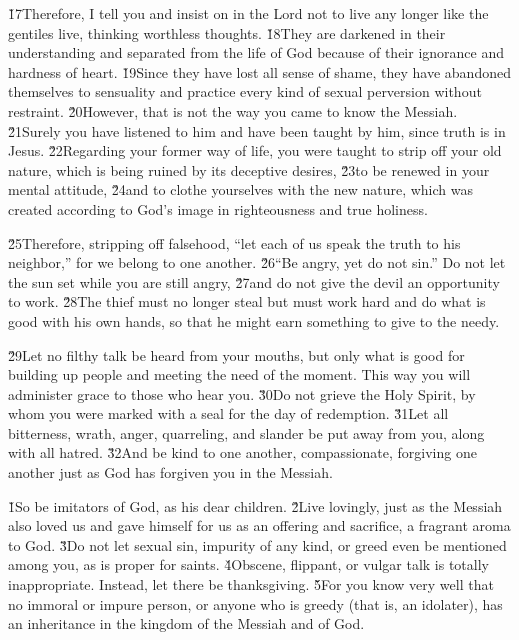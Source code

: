 \v{17}Therefore, I tell you and insist on in the Lord not to live any longer like the gentiles live, thinking worthless thoughts. \v{18}They are darkened in their understanding and separated from the life of God because of their ignorance and hardness of heart. \v{19}Since they have lost all sense of shame, they have abandoned themselves to sensuality and practice every kind of sexual perversion without restraint. \v{20}However, that is not the way you came to know the Messiah. \v{21}Surely you have listened to him and have been taught by him, since truth is in Jesus. \v{22}Regarding your former way of life, you were taught to strip off your old nature, which is being ruined by its deceptive desires, \v{23}to be renewed in your mental attitude, \v{24}and to clothe yourselves with the new nature, which was created according to God's image in righteousness and true holiness.

\v{25}Therefore, stripping off falsehood, ``let each of us speak the truth to his neighbor,'' for we belong to one another. \v{26}``Be angry, yet do not sin.'' Do not let the sun set while you are still angry, \v{27}and do not give the devil an opportunity to work. \v{28}The thief must no longer steal but must work hard and do what is good with his own hands, so that he might earn something to give to the needy.

\v{29}Let no filthy talk be heard from your mouths, but only what is good for building up people and meeting the need of the moment. This way you will administer grace to those who hear you. \v{30}Do not grieve the Holy Spirit, by whom you were marked with a seal for the day of redemption. \v{31}Let all bitterness, wrath, anger, quarreling, and slander be put away from you, along with all hatred. \v{32}And be kind to one another, compassionate, forgiving one another just as God has forgiven you in the Messiah.

\v{1}So be imitators of God, as his dear children. \v{2}Live lovingly, just as the Messiah also loved us and gave himself for us as an offering and sacrifice, a fragrant aroma to God. \v{3}Do not let sexual sin, impurity of any kind, or greed even be mentioned among you, as is proper for saints. \v{4}Obscene, flippant, or vulgar talk is totally inappropriate. Instead, let there be thanksgiving. \v{5}For you know very well that no immoral or impure person, or anyone who is greedy (that is, an idolater), has an inheritance in the kingdom of the Messiah and of God.

